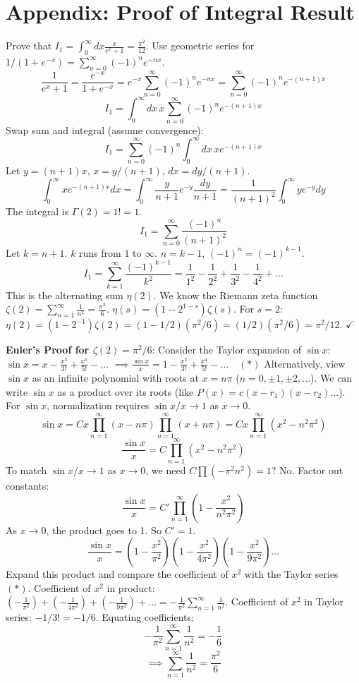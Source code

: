 \documentclass[11pt]{article}
\begin{document}
\section*{Appendix: Proof of Integral Result}
Prove that $I_1 = \int_0^\infty dx \frac{x}{e^x + 1} = \frac{\pi^2}{12}$.
Use geometric series for $1/(1+e^{-x}) = \sum_{n=0}^\infty (-1)^n e^{-nx}$.
\[ \frac{1}{e^x+1} = \frac{e^{-x}}{1+e^{-x}} = e^{-x} \sum_{n=0}^\infty (-1)^n e^{-nx} = \sum_{n=0}^\infty (-1)^n e^{-(n+1)x} \]
\[ I_1 = \int_0^\infty dx \, x \sum_{n=0}^\infty (-1)^n e^{-(n+1)x} \]
Swap sum and integral (assume convergence):
\[ I_1 = \sum_{n=0}^\infty (-1)^n \int_0^\infty dx \, x e^{-(n+1)x} \]
Let $y = (n+1)x$, $x = y/(n+1)$, $dx = dy/(n+1)$.
\[ \int_0^\infty x e^{-(n+1)x} dx = \int_0^\infty \frac{y}{n+1} e^{-y} \frac{dy}{n+1} = \frac{1}{(n+1)^2} \int_0^\infty y e^{-y} dy \]
The integral is $\Gamma(2)=1! = 1$.
\[ I_1 = \sum_{n=0}^\infty \frac{(-1)^n}{(n+1)^2} \]
Let $k=n+1$. $k$ runs from $1$ to $\infty$. $n=k-1$, $(-1)^n = (-1)^{k-1}$.
\[ I_1 = \sum_{k=1}^\infty \frac{(-1)^{k-1}}{k^2} = \frac{1}{1^2} - \frac{1}{2^2} + \frac{1}{3^2} - \frac{1}{4^2} + \dots \]
This is the alternating sum $\eta(2)$.
We know the Riemann zeta function $\zeta(2) = \sum_{n=1}^\infty \frac{1}{n^2} = \frac{\pi^2}{6}$.
$\eta(s) = (1 - 2^{1-s}) \zeta(s)$. For $s=2$: $\eta(2) = (1 - 2^{-1}) \zeta(2) = (1 - 1/2) (\pi^2/6) = (1/2)(\pi^2/6) = \pi^2/12$. $\checkmark$

\textbf{Euler's Proof for $\zeta(2)=\pi^2/6$}:
Consider the Taylor expansion of $\sin x$:
$\sin x = x - \frac{x^3}{3!} + \frac{x^5}{5!} - \dots$
$\implies \frac{\sin x}{x} = 1 - \frac{x^2}{3!} + \frac{x^4}{5!} - \dots \quad (*)$
Alternatively, view $\sin x$ as an infinite polynomial with roots at $x=n\pi$ ($n=0, \pm 1, \pm 2, \dots$).
We can write $\sin x$ as a product over its roots (like $P(x)=c(x-r_1)(x-r_2)\dots$). For $\sin x$, normalization requires $\sin x / x \to 1$ as $x \to 0$.
\[ \sin x = C x \prod_{n=1}^\infty (x - n\pi) \prod_{n=1}^\infty (x + n\pi) = C x \prod_{n=1}^\infty (x^2 - n^2\pi^2) \]
\[ \frac{\sin x}{x} = C \prod_{n=1}^\infty (x^2 - n^2\pi^2) \]
To match $\sin x / x \to 1$ as $x \to 0$, we need $C \prod (-\pi^2 n^2) = 1$? No.
Factor out constants:
\[ \frac{\sin x}{x} = C' \prod_{n=1}^\infty (1 - \frac{x^2}{n^2\pi^2}) \]
As $x \to 0$, the product goes to 1. So $C'=1$.
\[ \frac{\sin x}{x} = \left(1 - \frac{x^2}{\pi^2}\right) \left(1 - \frac{x^2}{4\pi^2}\right) \left(1 - \frac{x^2}{9\pi^2}\right) \dots \]
Expand this product and compare the coefficient of $x^2$ with the Taylor series $(*)$.
Coefficient of $x^2$ in product: $(-\frac{1}{\pi^2}) + (-\frac{1}{4\pi^2}) + (-\frac{1}{9\pi^2}) + \dots = -\frac{1}{\pi^2} \sum_{n=1}^\infty \frac{1}{n^2}$.
Coefficient of $x^2$ in Taylor series: $-1/3! = -1/6$.
Equating coefficients:
\[ -\frac{1}{\pi^2} \sum_{n=1}^\infty \frac{1}{n^2} = -\frac{1}{6} \]
\[ \implies \sum_{n=1}^\infty \frac{1}{n^2} = \frac{\pi^2}{6} \]
\end{document}
